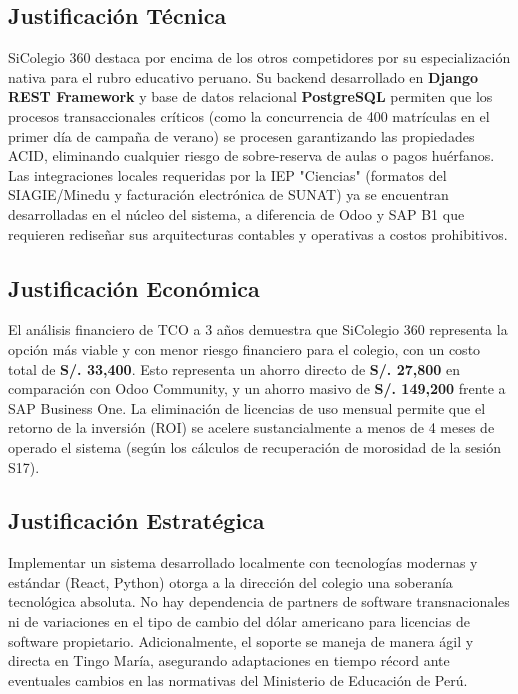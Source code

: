 \documentclass[12pt,a4paper,oneside]{report}
\begin{document}
\subsection{Justificación Técnica}
SiColegio 360 destaca por encima de los otros competidores por su especialización nativa para el rubro educativo peruano. Su backend desarrollado en \textbf{Django REST Framework} y base de datos relacional \textbf{PostgreSQL} permiten que los procesos transaccionales críticos (como la concurrencia de 400 matrículas en el primer día de campaña de verano) se procesen garantizando las propiedades ACID, eliminando cualquier riesgo de sobre-reserva de aulas o pagos huérfanos. Las integraciones locales requeridas por la IEP "Ciencias" (formatos del SIAGIE/Minedu y facturación electrónica de SUNAT) ya se encuentran desarrolladas en el núcleo del sistema, a diferencia de Odoo y SAP B1 que requieren rediseñar sus arquitecturas contables y operativas a costos prohibitivos.

\subsection{Justificación Económica}
El análisis financiero de TCO a 3 años demuestra que SiColegio 360 representa la opción más viable y con menor riesgo financiero para el colegio, con un costo total de \textbf{S/. 33,400}. Esto representa un ahorro directo de \textbf{S/. 27,800} en comparación con Odoo Community, y un ahorro masivo de \textbf{S/. 149,200} frente a SAP Business One. La eliminación de licencias de uso mensual permite que el retorno de la inversión (ROI) se acelere sustancialmente a menos de 4 meses de operado el sistema (según los cálculos de recuperación de morosidad de la sesión S17).

\subsection{Justificación Estratégica}
Implementar un sistema desarrollado localmente con tecnologías modernas y estándar (React, Python) otorga a la dirección del colegio una soberanía tecnológica absoluta. No hay dependencia de partners de software transnacionales ni de variaciones en el tipo de cambio del dólar americano para licencias de software propietario. Adicionalmente, el soporte se maneja de manera ágil y directa en Tingo María, asegurando adaptaciones en tiempo récord ante eventuales cambios en las normativas del Ministerio de Educación de Perú.

\newpage
\end{document}
